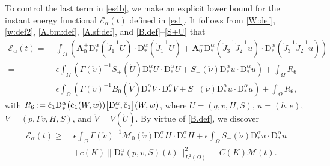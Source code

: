 \documentclass[twoside,11pt]{article}
\numberwithin{equation}{section}
\begin{document}
To control the last term in \eqref{es4b}, we make an explicit lower bound for the instant energy functional $\mathcal{E}_{\alpha}(t)$ defined in \eqref{es1}.
It follows from \eqref{W:def}, \eqref{w:def2}, \eqref{A.bm:def}, \eqref{A.sf:def}, and \eqref{B.def}--\eqref{S+U} that
\begin{align}
	\mathcal{E}_{\alpha}(t)
	=\;&
	\int_{\Omega} \left(\bm{A}_0^+\mathrm{D}_*^{\alpha}(\mathring{J}_1^{-1}U)\cdot \mathrm{D}_*^{\alpha}(\mathring{J}_1^{-1}U)
	+ \bm{A}_0^-\mathrm{D}_*^{\alpha}(\mathring{J}_3^{-1}\mathring{J}_2^{-1}u)\cdot \mathrm{D}_*^{\alpha}(\mathring{J}_3^{-1}\mathring{J}_2^{-1}u)\right) \nonumber\\[1mm]
	=\;&
	\epsilon \int_{\Omega} \left(\varGamma(\mathring{v})^{-1}S_{+}(\mathring{U})\mathrm{D}_*^{\alpha}U\cdot \mathrm{D}_*^{\alpha}U
	+  S_{-}(\mathring{\nu})\mathrm{D}_*^{\alpha}u\cdot \mathrm{D}_*^{\alpha}u\right)
+\int_{\Omega}R_6
\nonumber	\\[1mm]
=\; &
\epsilon \int_{\Omega} \left(\varGamma(\mathring{v})^{-1} B_{0}(\mathring{V})\mathrm{D}_*^{\alpha}V\cdot \mathrm{D}_*^{\alpha}V
+  S_{-}(\mathring{\nu})\mathrm{D}_*^{\alpha}u\cdot \mathrm{D}_*^{\alpha}u\right)
+\int_{\Omega}R_6,
\nonumber %
\end{align}
with $R_6:=\mathring{\rm c}_1\mathrm{D}_*^{\alpha}\big(\mathring{\rm c}_1(W,w) )\big[\mathrm{D}_*^{\alpha},\mathring{\rm c}_1\big] (W,w)$,
where
$U=(q,v,H,S)$, $u=(h,e)$,
$V=(p,\varGamma v, H,S)$, and $\mathring{V}=V(\mathring{U})$.
By virtue of \eqref{B.def}, we discover
\begin{align}
 \mathcal{E}_{\alpha}(t)
 \geq \; &	 \epsilon \int_{\Omega}  \varGamma(\mathring{v})^{-1}\mathcal{M}_{0}(\mathring{v})\mathrm{D}_*^{\alpha}H\cdot \mathrm{D}_*^{\alpha}H
 +  \epsilon \int_{\Omega} S_{-}(\mathring{\nu})\mathrm{D}_*^{\alpha}u\cdot \mathrm{D}_*^{\alpha}u  \nonumber \\[1mm]
&+ c(K)\big\|\mathrm{D}_*^{\alpha}(p,v,S)(t)\big\|^2_{L^2(\Omega)}
	-C(K)\mathcal{M}(t).
	\label{E.cal:es3}
\end{align}
\end{document}
